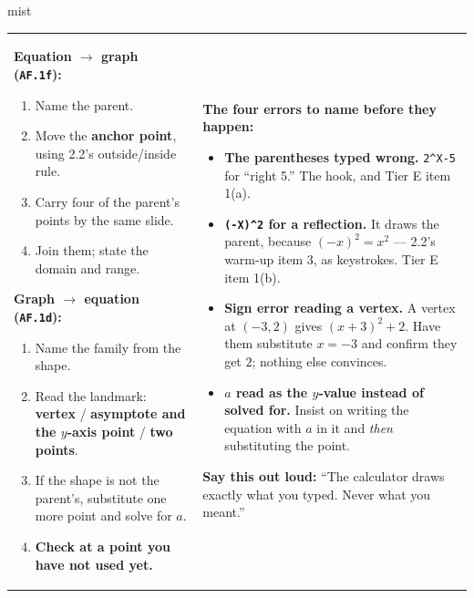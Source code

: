 \documentclass[10pt]{article}
\begin{document}
\boxguard
\begin{skillbox}{mist}
\begin{tabularx}{\linewidth}{@{}X|X@{}}
\begin{minipage}[t]{\linewidth}\vspace{0pt}
\textbf{Equation $\to$ graph (\texttt{AF.1f}):}
\begin{enumerate}[leftmargin=1.4em, itemsep=1pt, topsep=2pt]
  \item Name the parent.
  \item Move the \textbf{anchor point}, using 2.2's outside/inside rule.
  \item Carry four of the parent's points by the same slide.
  \item Join them; state the domain and range.
\end{enumerate}
\textbf{Graph $\to$ equation (\texttt{AF.1d}):}
\begin{enumerate}[leftmargin=1.4em, itemsep=1pt, topsep=2pt]
  \item Name the family from the shape.
  \item Read the landmark: \textbf{vertex} / \textbf{asymptote and the $y$-axis point} /
        \textbf{two points}.
  \item If the shape is not the parent's, substitute one more point and solve for $a$.
  \item \textbf{Check at a point you have not used yet.}
\end{enumerate}
\end{minipage}
&
\begin{minipage}[t]{\linewidth}\vspace{0pt}
\textbf{The four errors to name before they happen:}
\begin{itemize}[leftmargin=1.1em, itemsep=2pt, topsep=2pt]
  \item \textbf{The parentheses typed wrong.} \texttt{2\^{}X-5} for ``right 5.'' The hook, and Tier E
        item 1(a).
  \item \textbf{\texttt{(-X)\^{}2} for a reflection.} It draws the parent, because $(-x)^2=x^2$ ---
        2.2's warm-up item 3, as keystrokes. Tier E item 1(b).
  \item \textbf{Sign error reading a vertex.} A vertex at $(-3,2)$ gives $(x+3)^2+2$. Have them
        substitute $x=-3$ and confirm they get $2$; nothing else convinces.
  \item \textbf{$a$ read as the $y$-value instead of solved for.} Insist on writing the equation with
        $a$ in it and \emph{then} substituting the point.
\end{itemize}
\textbf{Say this out loud:} ``The calculator draws exactly what you typed. Never what you meant.''
\end{minipage}
\end{tabularx}
\end{skillbox}
\end{document}
